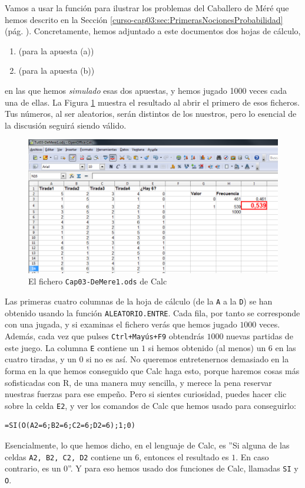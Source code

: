 \documentclass[10pt,a4paper]{article}\usepackage[]{graphicx}\usepackage[]{color}
\newcounter {cont01}
\begin{document}
Vamos a usar la función para ilustrar los problemas del Caballero de Méré que hemos descrito en la Sección \ref{curso-cap03:sec:PrimerasNocionesProbabilidad} (pág. \pageref{curso-cap03:sec:PrimerasNocionesProbabilidad}). Concretamente, hemos adjuntado a este documentos dos hojas de cálculo,
\begin{center}
\begin{enumerate}
\item {} (para la apuesta (a))
\item {} (para la apuesta (b))
\end{enumerate}
\end{center}
en las que hemos {\em simulado} esas dos apuestas, y hemos jugado 1000 veces cada una de ellas. La Figura \ref{tut03:fig:Cap03-DeMere1.ods} muestra el resultado al abrir el primero de esos ficheros. Tus números, al ser aleatorios, serán distintos de los nuestros, pero lo esencial de la discusión seguirá siendo válido.
\begin{figure}[h!]
\begin{center}
\includegraphics[width=15cm]{./fig/Tut03-41.png}
\end{center}
\caption{El fichero {\tt Cap03-DeMere1.ods} de Calc}
\label{tut03:fig:Cap03-DeMere1.ods}
\end{figure}
Las primeras cuatro columnas de la hoja de cálculo (de la {\tt A} a la {\tt D}) se han obtenido usando la función {\tt ALEATORIO.ENTRE}. Cada fila, por tanto se corresponde con una jugada, y si examinas el fichero verás que hemos jugado $1000$ veces.  Además, cada vez que pulses {\tt Ctrl+Mayús+F9} obtendrás $1000$ nuevas partidas de este juego. La columna {\tt E} contiene
un $1$ si hemos obtenido (al menos) un $6$ en las cuatro tiradas, y un $0$ si no es así. No queremos entretenernos demasiado en la forma en la que hemos conseguido que Calc haga esto, porque haremos cosas más  sofisticadas con R, de una manera muy sencilla, y merece la pena reservar nuestras fuerzas para ese empeño. Pero si sientes curiosidad, puedes hacer clic sobre la celda {\tt E2}, y ver los comandos de Calc que hemos usado para conseguirlo:
     \begin{verbatim}
=SI(O(A2=6;B2=6;C2=6;D2=6);1;0)
\end{verbatim}
Esencialmente, lo que hemos dicho, en el lenguaje de Calc, es ''Si alguna de las celdas {\tt A2, B2, C2, D2} contiene un 6, entonces el resultado es $1$. En caso contrario, es un $0$''. Y para eso hemos usado dos funciones de Calc, llamadas {\tt SI} y {\tt O}.
\end{document}
